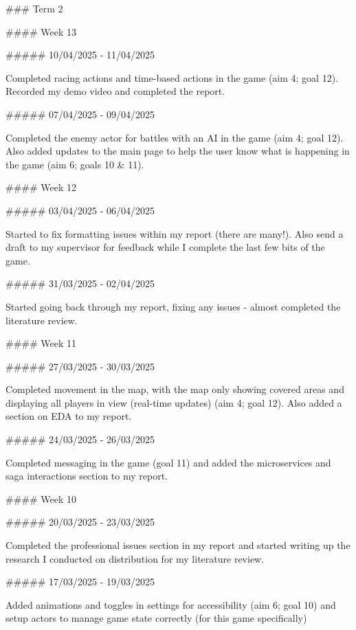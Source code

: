 \documentclass[]{final}
\begin{document}
\begin{markdown}

  ### Term 2

  #### Week 13

  ##### 10/04/2025 - 11/04/2025

  Completed racing actions and time-based actions in the game (aim 4; goal 12).
  Recorded my demo video and completed the report.

  ##### 07/04/2025 - 09/04/2025

  Completed the enemy actor for battles with an AI in the game (aim 4; goal 12).
  Also added updates to the main page to help the user know what is happening in the game (aim 6; goals 10 & 11).



  #### Week 12

  ##### 03/04/2025 - 06/04/2025

  Started to fix formatting issues within my report (there are many!).
  Also send a draft to my supervisor for feedback while I complete the last few bits of the game.

  ##### 31/03/2025 - 02/04/2025

  Started going back through my report, fixing any issues - almost completed the literature review.



  #### Week 11

  ##### 27/03/2025 - 30/03/2025

  Completed movement in the map, with the map only showing covered areas and displaying all players in view (real-time updates) (aim 4; goal 12).
  Also added a section on EDA to my report.

  ##### 24/03/2025 - 26/03/2025

  Completed messaging in the game (goal 11) and added the microservices and saga interactions section to my report.



  #### Week 10

  ##### 20/03/2025 - 23/03/2025

  Completed the professional issues section in my report and started writing up the research I conducted on distribution for my literature review.

  ##### 17/03/2025 - 19/03/2025

  Added animations and toggles in settings for accessibility (aim 6; goal 10) and setup actors to manage game state correctly (for this game specifically)




\end{markdown}
\end{document}

